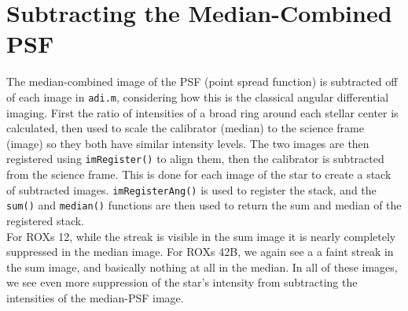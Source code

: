\documentclass[12pt]{article}
\begin{document}
\section{Subtracting the Median-Combined PSF}
The median-combined image of the PSF (point spread function) is subtracted off of each image in \texttt{adi.m}, considering how this is the classical angular differential imaging. First the ratio of intensities of a broad ring around each stellar center is calculated, then used to scale the calibrator (median) to the science frame (image) so they both have similar intensity levels. The two images are then registered using \texttt{imRegister()} to align them, then the calibrator is subtracted from the science frame. This is done for each image of the star to create a stack of subtracted images. \texttt{imRegisterAng()} is used to register the stack, and the \texttt{sum()} and \texttt{median()} functions are then used to return the sum and median of the registered stack.\\
\indent For ROXs 12, while the streak is visible in the sum image it is nearly completely suppressed in the median image. For ROXs 42B, we again see a a faint streak in the sum image, and basically nothing at all in the median. In all of these images, we see even more suppression of the star's intensity from subtracting the intensities of the median-PSF image.
\end{document}

